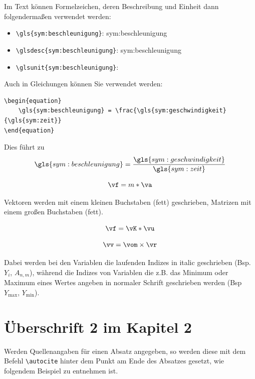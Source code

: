 Im Text können Formelzeichen, deren Beschreibung und Einheit dann folgendermaßen verwendet werden:
\begin{itemize}
	\item \verb|\gls{sym:beschleunigung}|: \gls{sym:beschleunigung}
	\item \verb|\glsdesc{sym:beschleunigung}|: \glsdesc{sym:beschleunigung}
	\item \verb||: \glsunit{sym:beschleunigung}
\end{itemize}

Auch in Gleichungen können Sie verwendet werden:

\begin{verbatim}
\begin{equation}
    \gls{sym:beschleunigung} = \frac{\gls{sym:geschwindigkeit}{\gls{sym:zeit}} 
\end{equation}   
\end{verbatim}
Dies führt zu
\begin{equation}
    \gls{sym:beschleunigung} = \frac{\gls{sym:geschwindigkeit}}{\gls{sym:zeit}} 
\end{equation}

\begin{equation}
	\vf = m * \va
	\label{eqn:beispielformel1}
\end{equation}

Vektoren werden mit einem kleinen Buchstaben (fett) geschrieben, Matrizen mit einem großen Buchstaben (fett). 

\begin{equation}
	\vf = \vK * \vu
	\label{eqn:beispielformel2}
\end{equation}

\begin{equation}
	\vv = \vom \times \vr
	\label{eqn:beispielformel3}
\end{equation}

Dabei werden bei den Variablen die laufenden Indizes in italic geschrieben (Bsp. $Y_{i}$, $A_{n,m}$), während die Indizes von Variablen die z.B. das Minimum oder Maximum eines Wertes angeben in normaler Schrift geschrieben werden (Bsp $Y_{\text{max}}$, $Y_{\text{min}}$).

\section{Überschrift 2 im Kapitel 2}

Werden Quellenangaben für einen Absatz angegeben, so werden diese mit dem Befehl \verb|\autocite| hinter dem Punkt am Ende des Absatzes gesetzt, wie folgendem Beispiel zu entnehmen ist. \\
\lipsum[1-1] \autocite{DIN15018T3}

